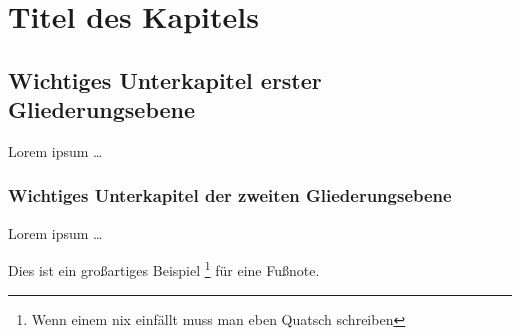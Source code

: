 \chapter{Titel des Kapitels}

\section{Wichtiges Unterkapitel erster Gliederungsebene}
Lorem ipsum \dots

\subsection{Wichtiges Unterkapitel der zweiten Gliederungsebene}
Lorem ipsum \dots

Dies ist ein großartiges Beispiel \footnote{Wenn einem nix einfällt muss man eben Quatsch schreiben} für eine Fußnote.